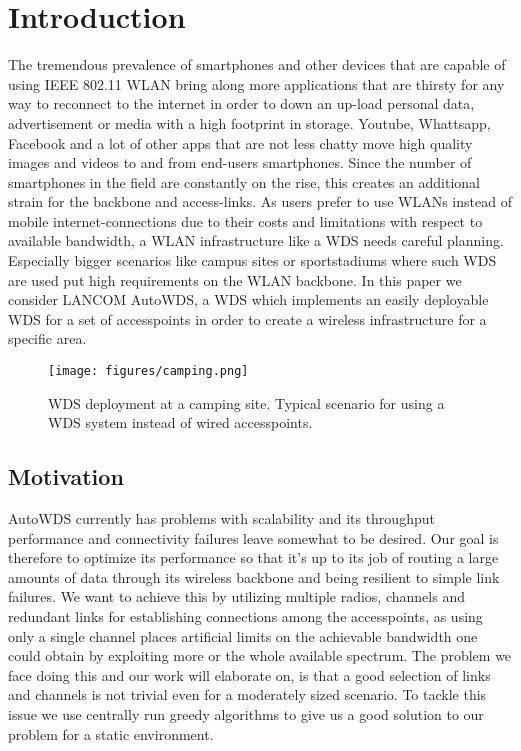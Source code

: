 \chapter{Introduction}
  The tremendous prevalence of smartphones and other devices that are capable of using IEEE 802.11 WLAN bring along 
  more applications that are thirsty for any way to reconnect to the internet in order to 
  down an up-load personal data, advertisement or media with a high footprint in storage.
  Youtube, Whattsapp, Facebook and a lot of other apps that are not less chatty move high quality images and videos 
  to and from end-users smartphones. Since the number of smartphones in the field are constantly on the rise, this creates an additional strain for
  the backbone and access-links. As users prefer to use WLANs instead of mobile internet-connections due to their costs and limitations with respect to available bandwidth,
  a WLAN infrastructure like a WDS needs careful planning. Especially bigger scenarios like campus sites or sportstadiums where such WDS are used put high requirements on the
  WLAN backbone. In this paper we consider LANCOM AutoWDS, 
  a WDS which implements an easily deployable \ac{WDS} for a set of accesspoints in order to create a wireless infrastructure for a specific area.

  \begin{figure}[h]
    \centering
    \texttt{[image: figures/camping.png]}
    \caption{WDS deployment at a camping site. Typical scenario for using a WDS system instead of wired accesspoints.}
    \label{fig:camping}
  \end{figure}
  
\section{Motivation}
  AutoWDS currently has problems with scalability and its throughput performance and connectivity failures leave somewhat to be desired.
  Our goal is therefore to optimize its performance so that it's up to its job of routing a large amounts of data through its wireless backbone and being resilient to simple link
  failures. We want to achieve this by utilizing multiple radios, channels and redundant links for establishing connections among the accesspoints, as using only a single
  channel places artificial limits on the achievable bandwidth one could obtain by exploiting more or the whole available spectrum.
  The problem we face doing this and our work will elaborate on, is that a good selection of links and channels is not trivial even for a moderately sized scenario.
  To tackle this issue we use centrally run greedy algorithms to give us a good solution to our problem for a static environment.
  
